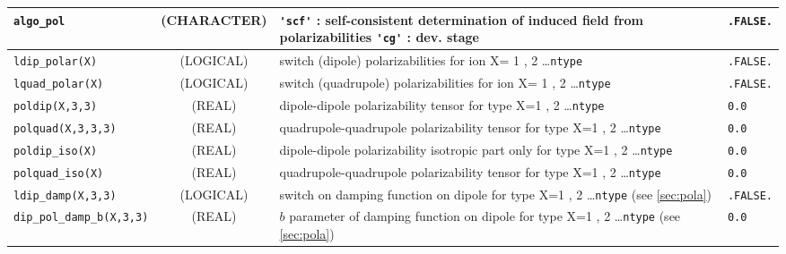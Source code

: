 \documentclass[a4paper,8pt]{article}
\begin{document}
\begin{longtable}{l|c|m{8cm}|m{2cm}}
\hline
\rule[-0.75cm]{0cm}{1.5cm}
\verb?algo_pol?  & (CHARACTER)        & \verb?'scf'? : self-consistent determination of induced field from polarizabilities
                                        \verb?'cg'? :  dev. stage                                                           & \verb?.FALSE.?\\
\hline
\rule[-0.75cm]{0cm}{1.5cm}
\verb?ldip_polar(X)? 
                 & (LOGICAL)          & switch (dipole) polarizabilities for ion X= 1 , 2 \ldots \verb?ntype?               & \verb?.FALSE.?\\
\hline
\rule[-0.75cm]{0cm}{1.5cm}
\verb?lquad_polar(X)? 
                 & (LOGICAL)          & switch (quadrupole) polarizabilities for ion X= 1 , 2 \ldots \verb?ntype?           & \verb?.FALSE.?\\
\hline
\rule[-0.75cm]{0cm}{1.5cm}
\verb?poldip(X,3,3)?
                 & (REAL)             & dipole-dipole polarizability tensor for type X=1 , 2 \ldots \verb?ntype?            & \verb?0.0? \\
\hline
\rule[-0.75cm]{0cm}{1.5cm}
\verb?polquad(X,3,3,3)?
                 & (REAL)             & quadrupole-quadrupole polarizability tensor for type X=1 , 2 \ldots \verb?ntype?    & \verb?0.0? \\
\hline
\rule[-0.75cm]{0cm}{1.5cm}
\verb?poldip_iso(X)?
                 & (REAL)             & dipole-dipole polarizability isotropic part only for type X=1 , 2 \ldots \verb?ntype?            
                                                                                                                            & \verb?0.0? \\
\hline
\rule[-0.75cm]{0cm}{1.5cm}
\verb?polquad_iso(X)?
                 & (REAL)             & quadrupole-quadrupole polarizability tensor for type X=1 , 2 \ldots \verb?ntype?    & \verb?0.0? \\
\hline
\rule[-0.75cm]{0cm}{1.5cm}
\verb?ldip_damp(X,3,3)?      
                 & (LOGICAL)          & switch on damping function on dipole for type X=1 , 2 \ldots \verb?ntype? (see \ref{sec:pola})         
                                                                                                                            & \verb?.FALSE.? \\
\hline
\rule[-0.75cm]{0cm}{1.5cm}
\verb?dip_pol_damp_b(X,3,3)?     
                 & (REAL)             & $b$ parameter of damping function on dipole for type X=1 , 2 \ldots \verb?ntype? (see \ref{sec:pola})
                                                                                                                            & \verb?0.0? \\

\end{longtable}
\end{document}
